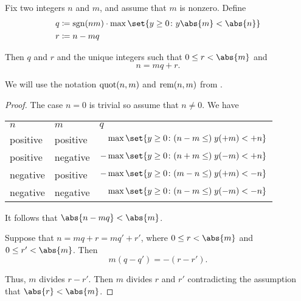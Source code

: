 \begin{algorithm}\label{alg:integer_division}
  Fix two integers \( n \) and \( m \), and assume that \( m \) is nonzero. Define
  \begin{align*}
    q &\coloneqq \sgn(nm) \cdot \max\set{ y \geq 0 \colon y\abs{m} < \abs{n} } \\
    r &\coloneqq n - mq
  \end{align*}

  Then \( q \) and \( r \) and the unique integers such that \( 0 \leq r < \abs{m} \) and
  \begin{equation*}
    n = mq + r.
  \end{equation*}

  We will use the notation \( \operatorname{quot}(n, m) \) and \( \operatorname{rem}(n, m) \) from .
\end{algorithm}
\begin{proof}
   The case \( n = 0 \) is trivial so assume that \( n \neq 0 \). We have
  \begin{center}
    \begin{tabular}{l | l | l}
      \( n \)  & \( m \)  & \( q \) \\
      positive & positive & \( \phantom{-}\max\set{ y \geq 0 \colon (n - m \leq) \thickspace y(+m) < +n } \) \\
      positive & negative & \( -\max\set{ y \geq 0 \colon (n + m \leq) \thickspace y(-m) < +n } \) \\
      negative & positive & \( -\max\set{ y \geq 0 \colon (m - n \leq) \thickspace y(+m) < -n } \) \\
      negative & negative & \( \phantom{-}\max\set{ y \geq 0 \colon (n - m \leq) \thickspace y(-m) < -n } \)
    \end{tabular}
  \end{center}

  It follows that \( \abs{n - mq} < \abs{m} \).

  \UniquenessSubProof Suppose that \( n = mq + r = mq' + r' \), where \( 0 \leq r < \abs{m} \) and \( 0 \leq r' < \abs{m} \). Then
  \begin{equation*}
    m(q - q') = -(r - r').
  \end{equation*}

  Thus, \( m \) divides \( r - r' \). Then \( m \) divides \( r \) and \( r' \) contradicting the assumption that \( \abs{r} < \abs{m} \).
\end{proof}

